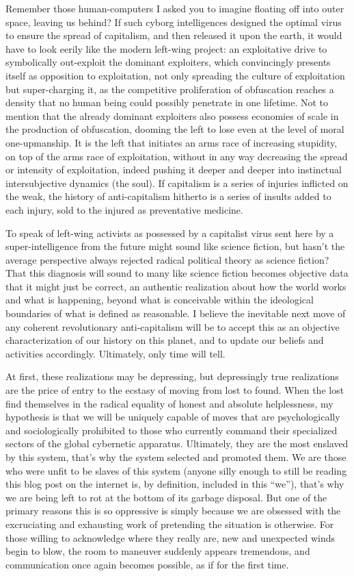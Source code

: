 \documentclass[a4paper,12pt,margin=.5in]{article}
\begin{document}
Remember those human-computers I asked you to imagine floating off into
outer space, leaving us behind? If such cyborg intelligences designed
the optimal virus to ensure the spread of capitalism, and then released
it upon the earth, it would have to look eerily like the modern
left-wing project: an exploitative drive to symbolically out-exploit the
dominant exploiters, which convincingly presents itself as opposition to
exploitation, not only spreading the culture of exploitation but
super-charging it, as the competitive proliferation of obfuscation
reaches a density that no human being could possibly penetrate in one
lifetime. Not to mention that the already dominant exploiters also
possess economies of scale in the production of obfuscation, dooming the
left to lose even at the level of moral one-upmanship. It is the left
that initiates an arms race of increasing stupidity, on top of the arms
race of exploitation, without in any way decreasing the spread or
intensity of exploitation, indeed pushing it deeper and deeper into
instinctual intersubjective dynamics (the soul). If capitalism is a
series of injuries inflicted on the weak, the history of anti-capitalism
hitherto is a series of insults added to each injury, sold to the
injured as preventative medicine.

To speak of left-wing activists as possessed by a capitalist virus sent
here by a super-intelligence from the future might sound like science
fiction, but hasn't the average perspective always rejected radical
political theory as science fiction? That this diagnosis will sound to
many like science fiction becomes objective data that it might just be
correct, an authentic realization about how the world works and what is
happening, beyond what is conceivable within the ideological boundaries
of what is defined as reasonable. I believe the inevitable next move of
any coherent revolutionary anti-capitalism will be to accept this as an
objective characterization of our history on this planet, and to update
our beliefs and activities accordingly. Ultimately, only time will tell.

At first, these realizations may be depressing, but depressingly true
realizations are the price of entry to the ecstasy of moving from lost
to found. When the lost find themselves in the radical equality of
honest and absolute helplessness, my hypothesis is that we will be
uniquely capable of moves that are psychologically and sociologically
prohibited to those who currently command their specialized sectors of
the global cybernetic apparatus. Ultimately, they are the most enslaved
by this system, that's why the system selected and promoted them. We are
those who were unfit to be slaves of this system (anyone silly enough to
still be reading this blog post on the internet is, by definition,
included in this ``we''), that's why we are being left to rot at the
bottom of its garbage disposal. But one of the primary reasons this is
so oppressive is simply because we are obsessed with the excruciating
and exhausting work of pretending the situation is otherwise. For those
willing to acknowledge where they really are, new and unexpected winds
begin to blow, the room to maneuver suddenly appears tremendous, and
communication once again becomes possible, as if for the first time.
\end{document}

